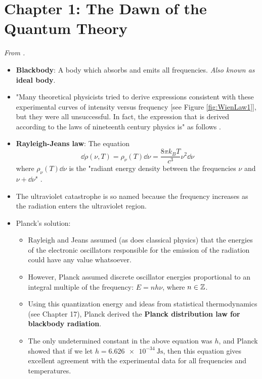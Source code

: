 \documentclass[../notes.tex]{subfiles}
\begin{document}
\section{Chapter 1: The Dawn of the Quantum Theory}
\emph{From \textcite{bib:McQuarrieSimon}.}
\begin{itemize}
    \item {}\textbf{Blackbody}: A body which absorbs and emits all frequencies. \emph{Also known as} \textbf{ideal body}.
    \item "Many theoretical physicists tried to derive expressions consistent with these experimental curves of intensity versus frequency [see Figure \ref{fig:WienLaw1}], but they were all unsuccessful. In fact, the expression that is derived according to the laws of nineteenth century physics is" as follows \parencite[3]{bib:McQuarrieSimon}.
    \item \textbf{Rayleigh-Jeans law}: The equation
    \begin{equation*}
        \dd{\rho(\nu,T)} = \rho_\nu(T)\dd{\nu} = \frac{8\pi k_BT}{c^3}\nu^2\dd{\nu}
    \end{equation*}
    where $\rho_\nu(T)\dd{\nu}$ is the "radiant energy density between the frequencies $\nu$ and $\nu+\dd{\nu}$" \parencite[3]{bib:McQuarrieSimon}.
    \item The ultraviolet catastrophe is so named because the frequency increases as the radiation enters the ultraviolet region.
    \item Planck's solution:
    \begin{itemize}
        \item Rayleigh and Jeans assumed (as does classical physics) that the energies of the electronic oscillators responsible for the emission of the radiation could have any value whatsoever.
        \item However, Planck assumed discrete oscillator energies proportional to an integral multiple of the frequency: $E=nh\nu$, where $n\in\mathbb{Z}$.
        \item Using this quantization energy and ideas from statistical thermodynamics (see Chapter 17), Planck derived the \textbf{Planck distribution law for blackbody radiation}.
        \item The only undetermined constant in the above equation was $h$, and Planck showed that if we let $h=\SI{6.626e-34}{\joule\second}$, then this equation gives excellent agreement with the experimental data for all frequencies and temperatures.
    \end{itemize}

\end{itemize}
\end{document}
